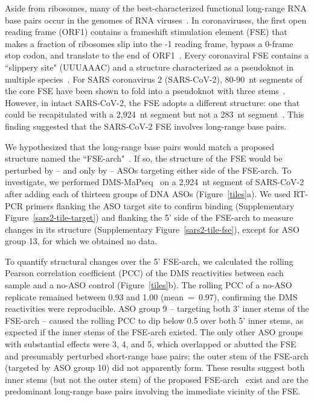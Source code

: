 \documentclass[main.tex]{subfiles}
\begin{document}
Aside from ribosomes, many of the best-characterized functional long-range RNA base pairs occur in the genomes of RNA viruses~\cite{Nicholson2014}.
In coronaviruses, the first open reading frame (ORF1) contains a frameshift stimulation element (FSE) that makes a fraction of ribosomes slip into the -1 reading frame, bypass a 0-frame stop codon, and translate to the end of ORF1~\cite{Plant2008}.
Every coronaviral FSE contains a ``slippery site" (UUUAAAC) and a structure characterized as a pseudoknot in multiple species~\cite{Brierley1989,Herald1993,Plant2005b}.
For SARS coronavirus 2 (SARS-CoV-2), 80-90~nt segments of the core FSE have been shown to fold into a pseudoknot with three stems~\cite{KZhang2021,Roman2021,Jones2022}.
However, in intact SARS-CoV-2, the FSE adopts a different structure: one that could be recapitulated with a 2,924~nt segment but not a 283~nt segment~\cite{Lan2022}.
This finding suggested that the SARS-CoV-2 FSE involves long-range base pairs.

We hypothesized that the long-range base pairs would match a proposed structure named the ``FSE-arch"~\cite{Ziv2020}.
If so, the structure of the FSE would be perturbed by -- and only by -- ASOs targeting either side of the FSE-arch.
To investigate, we performed DMS-MaPseq~\cite{Zubradt2016} on a 2,924~nt segment of SARS-CoV-2 after adding each of thirteen groups of DNA ASOs (Figure~\ref{tiles}a).
We used RT-PCR primers flanking the ASO target site to confirm binding (Supplementary Figure~\ref{sars2-tile-target}) and flanking the 5' side of the FSE-arch to measure changes in its structure (Supplementary Figure~\ref{sars2-tile-fse}), except for ASO group 13, for which we obtained no data.

To quantify structural changes over the 5' FSE-arch, we calculated the rolling Pearson correlation coefficient (PCC) of the DMS reactivities between each sample and a no-ASO control (Figure~\ref{tiles}b).
The rolling PCC of a no-ASO replicate remained between 0.93 and 1.00 (mean~=~0.97), confirming the DMS reactivities were reproducible.
ASO group 9 -- targeting both 3' inner stems of the FSE-arch -- caused the rolling PCC to dip below 0.5 over both 5' inner stems, as expected if the inner stems of the FSE-arch existed.
The only other ASO groups with substantial effects were 3, 4, and 5, which overlapped or abutted the FSE and presumably perturbed short-range base pairs; the outer stem of the FSE-arch (targeted by ASO group 10) did not apparently form.
These results suggest both inner stems (but not the outer stem) of the proposed FSE-arch~\cite{Ziv2020} exist and are the predominant long-range base pairs involving the immediate vicinity of the FSE.
\end{document}
